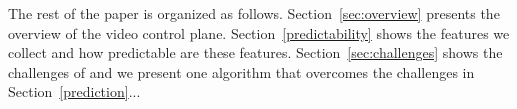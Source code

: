 The rest of the paper is organized as follows. Section~\ref{sec:overview} presents the overview of the video control plane. Section~\ref{predictability} shows the features we collect and how predictable are these features. Section~\ref{sec:challenges} shows the challenges of and we present one algorithm that overcomes the challenges in Section~\ref{prediction}...

